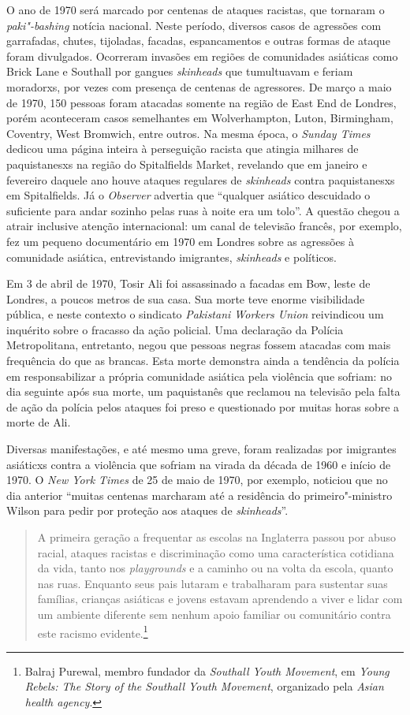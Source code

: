 O ano de 1970 será marcado por centenas de ataques racistas, que tornaram o \emph{paki"-bashing} notícia nacional. Neste período, diversos casos de agressões com garrafadas, chutes, tijoladas, facadas, espancamentos e outras formas de ataque foram divulgados. Ocorreram invasões em regiões de comunidades asiáticas como Brick Lane e Southall por gangues \emph{skinheads} que tumultuavam e feriam moradorxs, por vezes com presença de centenas de agressores. De março a maio de 1970, 150 pessoas foram atacadas somente na região de East End de Londres, porém aconteceram casos semelhantes em Wolverhampton, Luton, Birmingham, Coventry, West Bromwich, entre outros. Na mesma época, o \emph{Sunday Times} dedicou uma página inteira à perseguição racista que atingia milhares de paquistanesxs na região do Spitalfields Market, revelando que em janeiro e fevereiro daquele ano houve ataques regulares de \emph{skinheads} contra paquistanesxs em Spitalfields. Já o \emph{Observer} advertia que ``qualquer asiático descuidado o suficiente para andar sozinho pelas ruas à noite era um tolo''. A questão chegou a atrair inclusive atenção internacional: um canal de televisão francês, por exemplo, fez um pequeno documentário em 1970 em Londres sobre as agressões à comunidade asiática, entrevistando imigrantes, \emph{skinheads} e políticos.

Em 3 de abril de 1970, Tosir Ali foi assassinado a facadas em Bow, leste de Londres, a poucos metros de sua casa. Sua morte teve enorme visibilidade pública, e neste contexto o sindicato \emph{Pakistani Workers Union} reivindicou um inquérito sobre o fracasso da ação policial. Uma declaração da Polícia Metropolitana, entretanto, negou que pessoas negras fossem atacadas com mais frequência do que as brancas. Esta morte demonstra ainda a tendência da polícia em responsabilizar a própria comunidade asiática pela violência que sofriam: no dia seguinte após sua morte, um paquistanês que reclamou na televisão pela falta de ação da polícia pelos ataques foi preso e questionado por muitas horas sobre a morte de Ali.

Diversas manifestações, e até mesmo uma greve, foram realizadas por imigrantes asiáticxs contra a violência que sofriam na virada da década de 1960 e início de 1970. O \emph{New York Times} de 25 de maio de 1970, por exemplo, noticiou que no dia anterior ``muitas centenas marcharam até a residência do primeiro"-ministro Wilson para pedir por proteção aos ataques de \emph{skinheads}''.

\begin{quote}
A primeira geração a frequentar as escolas na Inglaterra passou por abuso racial, ataques racistas e discriminação como uma característica cotidiana da vida, tanto nos \emph{playgrounds} e a caminho ou na volta da escola, quanto nas ruas. Enquanto seus pais lutaram e trabalharam para sustentar suas famílias, crianças asiáticas e jovens estavam aprendendo a viver e lidar com um ambiente diferente sem nenhum apoio familiar ou comunitário contra este racismo evidente.\footnote{Balraj Purewal, membro fundador da \emph{Southall Youth Movement}, em \emph{Young Rebels: The Story of the Southall Youth Movement}, organizado pela \emph{Asian health agency}.}
\end{quote}

